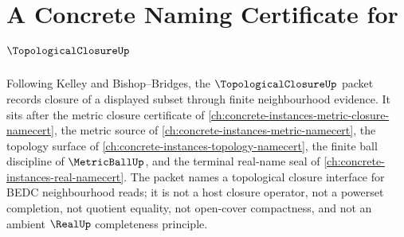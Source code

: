 \chapter{A Concrete Naming Certificate for $\TopologicalClosureUp$}
\label{ch:concrete-instances-topological-closure-namecert}

Following Kelley and Bishop--Bridges, the $\TopologicalClosureUp$ packet records closure of a displayed subset through finite neighbourhood evidence. It sits after the metric closure certificate of \autoref{ch:concrete-instances-metric-closure-namecert}, the metric source of \autoref{ch:concrete-instances-metric-namecert}, the topology surface of \autoref{ch:concrete-instances-topology-namecert}, the finite ball discipline of $\MetricBallUp$, and the terminal real-name seal of \autoref{ch:concrete-instances-real-namecert}. The packet names a topological closure interface for BEDC neighbourhood reads; it is not a host closure operator, not a powerset completion, not quotient equality, not open-cover compactness, and not an ambient $\RealUp$ completeness principle.

